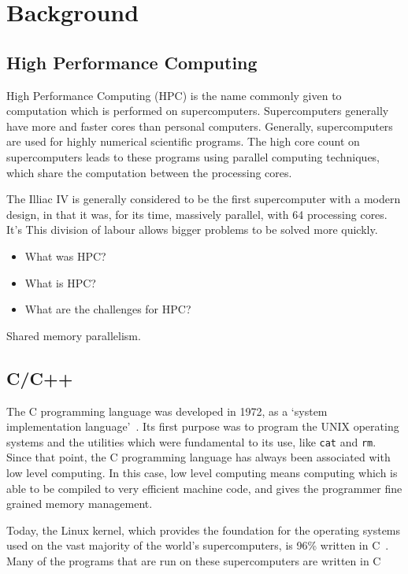 \chapter{Background}
\section{High Performance Computing}
High Performance Computing (HPC) is the name commonly given to computation which is performed on supercomputers. 
Supercomputers generally have more and faster cores than personal computers. Generally, supercomputers are used for highly numerical scientific programs. The high core count on supercomputers leads to these programs using parallel computing techniques, which share the computation between the processing cores.

The Illiac IV is generally considered to be the first supercomputer with a modern design, in that it was, for its time, massively parallel, with 64 processing cores. It's 
This division of labour allows bigger problems to be solved more quickly.

\begin{itemize}
    \item What was HPC?
    \item What is HPC?
    \item What are the challenges for HPC?
\end{itemize}

Shared memory parallelism.

\section{C/C++}
The C programming language was developed in 1972, as a `system implementation language'~\cite{Ritchie:1993}. Its first purpose was to program the UNIX operating systems and the utilities which were fundamental to its use, like \texttt{cat} and \texttt{rm}. Since that point, the C programming language has always been associated with low level computing. In this case, low level computing means computing which is able to be compiled to very efficient machine code, and gives the programmer fine grained memory management.

Today, the Linux kernel, which provides the foundation for the operating systems used on the vast majority of the world's supercomputers, is 96\% written in C~\cite{LinuxKernel}. Many of the programs that are run on these supercomputers are written in C~\cite{fftw, ffs, foam}

